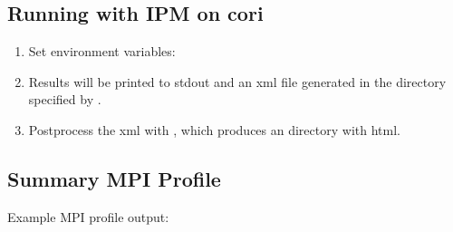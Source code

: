 \documentclass[letterpaper,10pt,english]{sphinxmanual}
\begin{document}
\subsection{Running with IPM on cori}
\label{\detokenize{External_Profiling_Tools:running-with-ipm-on-cori}}\begin{enumerate}
%
\item {} 
\sphinxAtStartPar
Set environment variables: 

\item {} 
\sphinxAtStartPar
Results will be printed to stdout and an xml file generated in the directory specified by .

\item {} 
\sphinxAtStartPar
Post\sphinxhyphen{}process the xml with , which produces an directory with html.

\end{enumerate}


\subsection{Summary MPI Profile}
\label{\detokenize{External_Profiling_Tools:summary-mpi-profile}}
\sphinxAtStartPar
Example MPI profile output:
\end{document}
